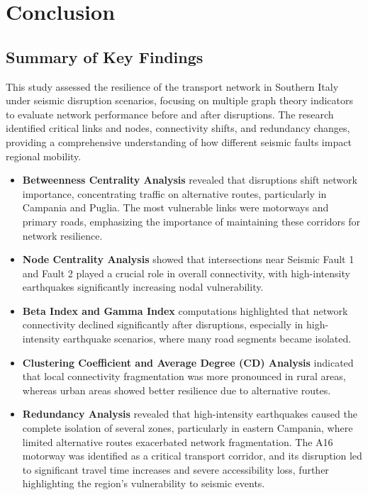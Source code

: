 \chapter{Conclusion}

\section{Summary of Key Findings}
This study assessed the resilience of the transport network in Southern Italy under seismic disruption scenarios, focusing on multiple graph theory indicators to evaluate network performance before and after disruptions. The research identified critical links and nodes, connectivity shifts, and redundancy changes, providing a comprehensive understanding of how different seismic faults impact regional mobility.

\begin{itemize}
    \item \textbf{Betweenness Centrality Analysis} revealed that disruptions shift network importance, concentrating traffic on alternative routes, particularly in Campania and Puglia. The most vulnerable links were motorways and primary roads, emphasizing the importance of maintaining these corridors for network resilience.
    
    \item \textbf{Node Centrality Analysis} showed that intersections near Seismic Fault 1 and Fault 2 played a crucial role in overall connectivity, with high-intensity earthquakes significantly increasing nodal vulnerability.
    
    \item \textbf{Beta Index and Gamma Index} computations highlighted that network connectivity declined significantly after disruptions, especially in high-intensity earthquake scenarios, where many road segments became isolated.
    
    \item \textbf{Clustering Coefficient and Average Degree (CD) Analysis} indicated that local connectivity fragmentation was more pronounced in rural areas, whereas urban areas showed better resilience due to alternative routes.
    
    \item \textbf{Redundancy Analysis} revealed that high-intensity earthquakes caused the complete isolation of several zones, particularly in eastern Campania, where limited alternative routes exacerbated network fragmentation. The A16 motorway was identified as a critical transport corridor, and its disruption led to significant travel time increases and severe accessibility loss, further highlighting the region’s vulnerability to seismic events.
\end{itemize}


